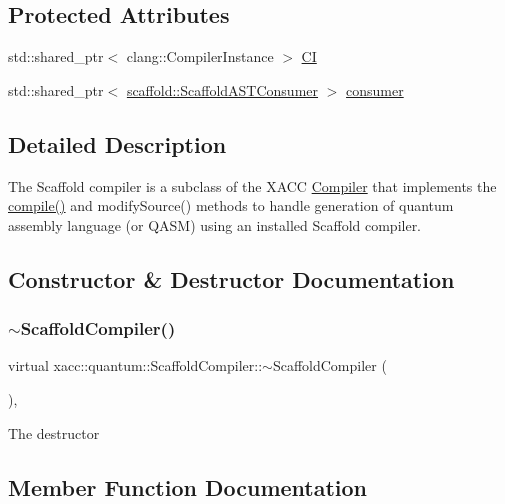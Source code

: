 \subsection*{Protected Attributes}
\begin{DoxyCompactItemize}
\item 
std\+::shared\+\_\+ptr$<$ clang\+::\+Compiler\+Instance $>$ \hyperlink{a01236_af7a3a73eaab025a0ea72cc9335d8fbb4}{CI}
\item 
std\+::shared\+\_\+ptr$<$ \hyperlink{a01232}{scaffold\+::\+Scaffold\+A\+S\+T\+Consumer} $>$ \hyperlink{a01236_a74f86a2074ec8bd5eeea3ad992433091}{consumer}
\end{DoxyCompactItemize}


\subsection{Detailed Description}
The Scaffold compiler is a subclass of the X\+A\+CC \hyperlink{a02448}{Compiler} that implements the \hyperlink{a01236_a7caede75bb2304ba405966651b115543}{compile()} and modify\+Source() methods to handle generation of quantum assembly language (or Q\+A\+SM) using an installed Scaffold compiler. 

\subsection{Constructor \& Destructor Documentation}
\mbox{\label{a01236_afb26398b07377ab9ddebc43a9376a6dd}} 
\subsubsection{\texorpdfstring{$\sim$\+Scaffold\+Compiler()}{~ScaffoldCompiler()}}
{\footnotesize\ttfamily virtual xacc\+::quantum\+::\+Scaffold\+Compiler\+::$\sim$\+Scaffold\+Compiler (\begin{DoxyParamCaption}{ }\end{DoxyParamCaption})\hspace{0.3cm}{\ttfamily [inline]}, {\ttfamily [virtual]}}

The destructor 

\subsection{Member Function Documentation}
\mbox{\label{a01236_a7caede75bb2304ba405966651b115543}} 
